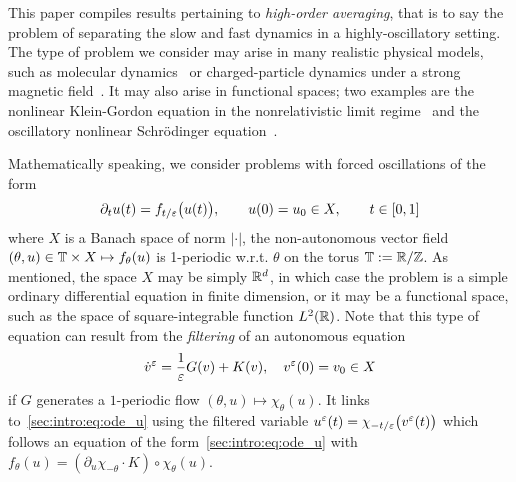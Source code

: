 This paper compiles results pertaining to \textit{high-order averaging},
that is to say the problem of separating the slow and fast dynamics in a
highly-oscillatory setting. The type of problem we consider may arise in
many realistic physical models, such as molecular
dynamics~\cite{garciaarchilla.1998.long} or charged-particle dynamics under a
strong magnetic field~\cite{chartier.2020.uniformly,
frenod.2009.long,frenod.2000.long}. It may also arise in functional
spaces; two examples are the nonlinear Klein-Gordon equation in the
nonrelativistic limit regime~\cite{bao.2014.uniformly,
bao.2019.comparison, chartier.2020.new} and the oscillatory nonlinear
Schrödinger equation~\cite{chartier.2015.uniformly,
castella.2015.stroboscopic}.


Mathematically speaking, we consider problems with forced oscillations of
the form 
\begin{equation} \label{sec:intro:eq:ode_u}
  \partial_t u(t) = f_{t/\varepsilon}\big( u(t) \big) , 
  \qquad 
  u(0) = u_0 \in X, 
  \qquad
  t \in [0, 1] 
\end{equation}
where \( X \) is a Banach space of norm \( | \cdot | \), the
non-autonomous vector field \( (\theta,u) \in \mathbb{T} \times X \mapsto
f_\theta(u) \) is 1-periodic w.r.t. \( \theta \) on the torus \( \mathbb{T} :=
\mathbb{R}/\mathbb{Z} \). As mentioned, the space \(X\) may be simply \( \mathbb{R}^d \), in which
case the problem is a simple ordinary differential equation in finite
dimension, or it may be a functional space, such as the space of
square-integrable function \( L^2(\mathbb{R}) \). 
%
Note that this type of equation can result from the \textit{filtering} of
an autonomous equation
\begin{equation} \label{sec:intro:eq:ode_auto}
  \dot v^{\varepsilon} = \frac{1}{\varepsilon} G(v) + K(v), \quad v^{\varepsilon}(0)=v_0 \in X
\end{equation}
if $G$ generates a $1$-periodic flow $(\theta, u) \mapsto \chi_\theta(u)$.
It links to~\ref{sec:intro:eq:ode_u} using the filtered variable 
$u^{\varepsilon}(t) = \chi_{-t/\varepsilon}\big(v^{\varepsilon}(t) \big)$ which
follows an equation of the form~\eqref{sec:intro:eq:ode_u} with
$f_{\theta}(u) = \left(\partial_u \chi_{-\theta}\cdot K \right) \circ
\chi_{\theta}(u)$. 

%

